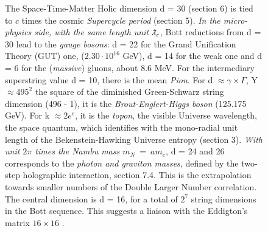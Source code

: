 \documentclass[a4paper,9pt]{article}
\begin{document}
\begin{figure}
{The Space-Time-Matter Holic dimension d = 30 (section 6) is tied to $c$ times the cosmic \textit{Supercycle period} (section 5). 
\textit{In the micro-physics side, with the same length unit $\lambdabar_e$}, Bott reductions from d = 30 lead to the \textit{gauge bosons}: d = 22 for the Grand Unification Theory (GUT) one, ($ 2.30\cdot10^{16}$ GeV), d = 14 for the weak one and d = 6 for the (\textit{massive}) gluons, about 8.6 MeV.
For the intermediary superstring value d = 10, there is the mean \textit{Pion}. For d $\approx \gamma \times \Gamma$, Y $\approx 495^2$ the square of the diminished Green-Schwarz string dimension (496 - 1), it is the \textit{Brout-Englert-Higgs boson} (125.175 GeV). For k $\approx 2e^e$, it is the \textit{topon}, the visible Universe wavelength, the space quantum, which identifies with the mono-radial unit length of the Bekenstein-Hawking Universe entropy (section 3).
   \textit{With unit $2\pi$ times the Nambu mass $m_N~=~am_e$}, d = 24 and 26 corresponds to the \textit{photon and graviton masses}, defined by the two-step holographic interaction\cite{Sanchez1}, section 7.4.}
This is the extrapolation towards smaller numbers of the Double Larger Number correlation.
The central dimension is d = 16, for a total of $2^7$ string dimensions in the Bott sequence.
This suggests a liaison with the Eddigton's matrix $16 \times 16$ \cite{Eddington}. 
    

\end{figure}
\end{document}
